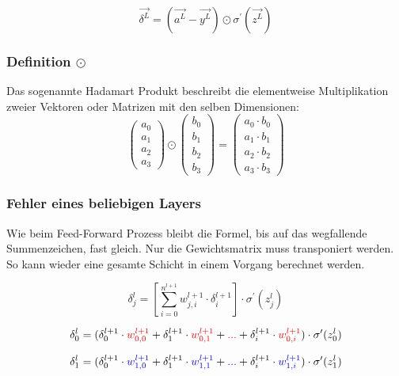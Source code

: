 \documentclass{article}
\begin{document}
\[ \vec{\delta^L} = (\vec{a^L} - \vec{y^L}) \odot \sigma^{\prime}(\vec{z^L}) \]


\subsubsection{Definition $\odot$}
Das sogenannte Hadamart Produkt beschreibt die elementweise Multiplikation zweier Vektoren oder Matrizen mit den selben Dimensionen:
\[ \left(\begin{array}{c}
    a_0 \\ a_1 \\ a_2 \\ a_3
\end{array}\right)
\odot \left(\begin{array}{c}
    b_0 \\ b_1 \\ b_2 \\ b_3
\end{array}\right) 
= \left(\begin{array}{c}
    a_0 \cdot b_0 \\ a_1 \cdot b_1 \\ a_2 \cdot b_2 \\ a_3 \cdot b_3
\end{array}\right) \]

\pagebreak
\subsubsection{Fehler eines beliebigen Layers}
Wie beim Feed-Forward Prozess bleibt die Formel, bis auf das wegfallende Summenzeichen, fast gleich. Nur die Gewichtsmatrix muss transponiert werden.
So kann wieder eine gesamte Schicht in einem Vorgang berechnet werden.

\[ \delta_j^{l} = [\sum_{i = 0}^{n^{l+1}} w_{j,i}^{l+1} \cdot \delta_i^{l+1} ] \cdot \sigma^{\prime}(z_j^{l})  \]

\[ \delta_0^l = (\delta_0^{l+1} \cdot \textcolor{red}{w_{0,0}^{l+1}} + \delta_1^{l+1} \cdot \textcolor{red}{w_{0,1}^{l+1}}
 + \textcolor{red}{...} + \delta_i^{l+1} \cdot \textcolor{red}{w_{0,i}^{l+1}}) \cdot \sigma^{\prime}(z_0^{l}) \]

 \[ \delta_1^l = (\delta_0^{l+1} \cdot \textcolor{blue}{w_{1,0}^{l+1}} + \delta_1^{l+1} \cdot \textcolor{blue}{w_{1,1}^{l+1}}
 + \textcolor{blue}{...} + \delta_i^{l+1} \cdot \textcolor{blue}{w_{1,i}^{l+1}}) \cdot \sigma^{\prime}(z_1^{l}) \]
\end{document}

